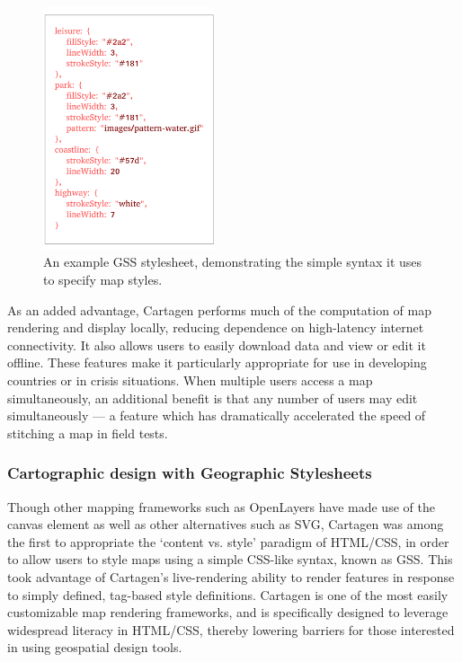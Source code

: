 \documentclass[11pt,oneside,notitlepage]{report}
\begin{document}
{{\begin{figure}
	\begin{flushright}
		\includegraphics[width=0.45\textwidth]{images/gss.pdf}
		\caption{An example \ac{GSS} stylesheet, demonstrating the simple syntax it uses to specify map styles.}
	\end{flushright}
\end{figure}

As an added advantage, Cartagen performs much of the computation of map rendering and display locally, reducing dependence on high-latency internet connectivity. It also allows users to easily download data and view or edit it offline. These features make it particularly appropriate for use in developing countries or in crisis situations. When multiple users access a map simultaneously, an additional benefit is that any number of users may edit simultaneously --- a feature which has dramatically accelerated the speed of stitching a map in field tests. 

\subsubsection{Cartographic design with Geographic Stylesheets}

Though other mapping frameworks such as OpenLayers have made use of the canvas element as well as other alternatives such as \ac{SVG}, Cartagen was among the first to appropriate the `content vs. style' paradigm of HTML/CSS, in order to allow users to style maps using a simple CSS-like syntax, known as \ac{GSS}. This took advantage of Cartagen's live-rendering ability to render features in response to simply defined, tag-based style definitions. Cartagen is one of the most easily customizable map rendering frameworks, and is specifically designed to leverage widespread literacy in HTML/CSS, thereby lowering barriers for those interested in using geospatial design tools. 

}}
\end{document}
